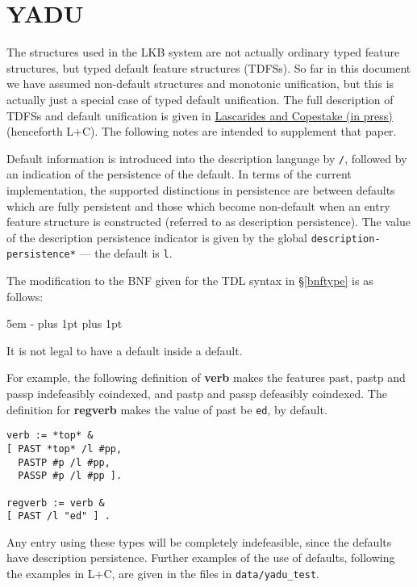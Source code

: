 \documentclass[12pt]{report}
\begin{document}
\section{YADU}
\label{defaults}

The structures used in the LKB system are not actually 
ordinary typed feature structures, but typed default feature
structures (TDFSs).  So far in this document we have assumed
non-default structures and monotonic unification, but this is actually
just a special case of typed default unification.
The full description of TDFSs and
default unification is
given in 
\href{http://www-csli.stanford.edu/~aac/papers/yadu.pdf}{Lascarides and
Copestake (in press)} (henceforth L+C).
The following notes are intended to supplement that paper.

Default information is introduced into the description
language by {\tt /}, followed by an indication of the persistence
of the default.  In terms of the current implementation,
the supported distinctions in persistence are between defaults
which are fully persistent and those which become non-default
when an entry feature structure is constructed (referred to as description
persistence).  The value of the
description persistence indicator is given by the global
{\tt *description-persistence*} --- the default is {\tt l}.

The modification to the BNF given for the TDL
syntax in \S\ref{bnftype} is as follows:
\begin{list}{}
   {\leftmargin 5em
    \itemindent -\leftmargin
    \itemsep 0pt plus 1pt
    \parsep 0pt plus 1pt}
\end{list}
It is not legal to have a default inside a default.

For example, the following definition of {\bf verb} makes
the features {\sc past}, {\sc pastp} and {\sc passp} indefeasibly
coindexed, and {\sc pastp} and {\sc passp} defeasibly coindexed.
The definition for {\bf regverb} makes the value of {\sc past} be
{\tt ed}, by default.
\begin{verbatim}
verb := *top* &
[ PAST *top* /l #pp,
  PASTP #p /l #pp,
  PASSP #p /l #pp ].

regverb := verb &
[ PAST /l "ed" ] .
\end{verbatim}
Any entry using these types will be completely indefeasible,
since the defaults have description persistence.
Further examples of the use of defaults, following the examples in
L+C, are given in the files in {\tt data/yadu\_test}.
\end{document}
